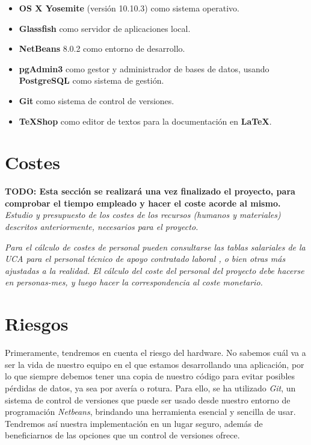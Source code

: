 \begin{itemize}
\item \textbf{OS X Yosemite} (versión 10.10.3) como sistema operativo.
\item \textbf{Glassfish} como servidor de aplicaciones local.
\item \textbf{NetBeans} 8.0.2 como entorno de desarrollo.
\item \textbf{pgAdmin3} como gestor y administrador de bases de datos, usando \textbf{PostgreSQL} como sistema de gestión.
\item \textbf{Git} como sistema de control de versiones.
\item \textbf{TeXShop} como editor de textos para la documentación en \textbf{LaTeX}.
\end{itemize}


\section{Costes}

\textbf{TODO: Esta sección se realizará una vez finalizado el proyecto, para comprobar el tiempo empleado y hacer el coste acorde al mismo.}
\\

\textit{Estudio y presupuesto de los costes de los recursos (humanos y materiales) descritos anteriormente, necesarios para el proyecto.}

\textit{Para el cálculo de costes de personal pueden consultarse las tablas salariales de la UCA para el personal técnico de apoyo contratado laboral \cite{paslaboral}, o bien otras más ajustadas a la realidad. El cálculo del coste del personal del proyecto debe hacerse en personas-mes, y luego hacer la correspondencia al coste monetario.}

\section{Riesgos}

Primeramente, tendremos en cuenta el riesgo del hardware. No sabemos cuál va a ser la vida de nuestro equipo en el que estamos desarrollando una aplicación, por lo que siempre debemos tener una copia de nuestro código para evitar posibles pérdidas de datos, ya sea por avería o rotura. Para ello, se ha utilizado \textit{Git}, un sistema de control de versiones que puede ser usado desde nuestro entorno de programación \textit{Netbeans}, brindando una herramienta esencial y sencilla de usar. Tendremos así nuestra implementación en un lugar seguro, además de beneficiarnos de las opciones que un control de versiones ofrece.
\\

